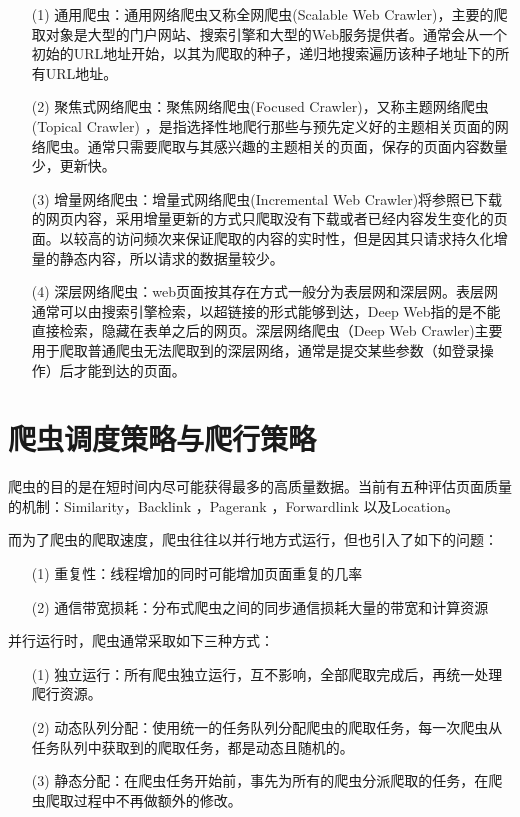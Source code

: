 \documentclass[doctor,privacy,twoside]{buaa_mac}
\begin{document}
\begin{itemize}
\item[(1)] 通用爬虫：通用网络爬虫又称全网爬虫(Scalable Web Crawler)，主要的爬取对象是大型的门户网站、搜索引擎和大型的Web服务提供者。通常会从一个初始的URL地址开始，以其为爬取的种子，递归地搜索遍历该种子地址下的所有URL地址。
\item[(2)] 聚焦式网络爬虫：聚焦网络爬虫(Focused Crawler)，又称主题网络爬虫(Topical Crawler)	，是指选择性地爬行那些与预先定义好的主题相关页面的网络爬虫。通常只需要爬取与其感兴趣的主题相关的页面，保存的页面内容数量少，更新快。
\item[(3)] 增量网络爬虫：增量式网络爬虫(Incremental Web Crawler)将参照已下载的网页内容，采用增量更新的方式只爬取没有下载或者已经内容发生变化的页面。以较高的访问频次来保证爬取的内容的实时性，但是因其只请求持久化增量的静态内容，所以请求的数据量较少。
\item[(4)] 深层网络爬虫：web页面按其存在方式一般分为表层网和深层网。表层网通常可以由搜索引擎检索，以超链接的形式能够到达，Deep Web指的是不能直接检索，隐藏在表单之后的网页。深层网络爬虫（Deep Web Crawler)主要用于爬取普通爬虫无法爬取到的深层网络，通常是提交某些参数（如登录操作）后才能到达的页面。
\end{itemize}




\section{爬虫调度策略与爬行策略}
爬虫的目的是在短时间内尽可能获得最多的高质量数据。当前有五种评估页面质量的机制：Similarity，Backlink ，Pagerank ，Forwardlink 以及Location。

而为了爬虫的爬取速度，爬虫往往以并行地方式运行，但也引入了如下的问题：

\begin{itemize}
\item[(1)] 重复性：线程增加的同时可能增加页面重复的几率
\item[(2)] 通信带宽损耗：分布式爬虫之间的同步通信损耗大量的带宽和计算资源
\end{itemize}


并行运行时，爬虫通常采取如下三种方式：
\begin{itemize}
\item[(1)] 独立运行：所有爬虫独立运行，互不影响，全部爬取完成后，再统一处理爬行资源。
\item[(2)] 动态队列分配：使用统一的任务队列分配爬虫的爬取任务，每一次爬虫从任务队列中获取到的爬取任务，都是动态且随机的。
\item[(3)] 静态分配：在爬虫任务开始前，事先为所有的爬虫分派爬取的任务，在爬虫爬取过程中不再做额外的修改。
\end{itemize}
\end{document}

